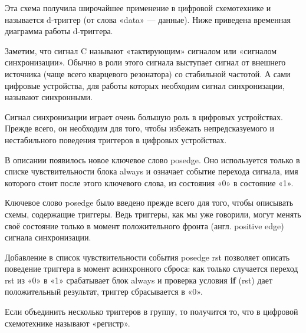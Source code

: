 \documentclass[a5paper, DIV=14, headings=openany, twoside=true,fontsize=10pt, titlepage]{scrreprt}
\newcommand{\quotes}[1]{«#1»}
\newcommand{\eng}[1]{\foreignlanguage{english}{#1}}
\newcommand{\qeng}[1]{\quotes{\eng{#1}}}
\newcommand{\kword}[1]{\eng{\textbf{#1}}}
\begin{document}
\par{Эта схема получила широчайшее применение в цифровой схемотехнике и называется \eng{d}-триггер (от слова \qeng{data} — данные). Ниже приведена временная диаграмма работы \eng{d}-триггера.}
		
\par{Заметим, что сигнал \eng{C} называют \quotes{тактирующим} сигналом или \quotes{сигналом синхронизации}. Обычно в роли этого сигнала выступает сигнал от внешнего источника (чаще всего кварцевого резонатора) со стабильной частотой. А сами цифровые устройства, для работы которых необходим сигнал синхронизации, называют синхронными.}

\par{Сигнал синхронизации играет очень большую роль в цифровых устройствах. Прежде всего, он необходим для того, чтобы избежать непредсказуемого и нестабильного поведения триггеров в цифровых устройствах.}


		
\par{В описании появилось новое ключевое слово \eng{posedge}. Оно используется только в списке чувствительности блока \eng{always} и означает событие перехода сигнала, имя которого стоит после этого ключевого слова, из состояния \quotes{0} в состояние \quotes{1}.}
		
		
\par{Ключевое слово \eng{posedge} было введено прежде всего для того, чтобы описывать схемы, содержащие триггеры. Ведь триггеры, как мы уже говорили, могут менять своё состояние только в момент положительного фронта (англ. \eng{positive edge}) сигнала синхронизации.}
		
		
\par{Добавление в список чувствительности события \eng{posedge rst} позволяет описать поведение триггера в момент асинхронного сброса: как только случается переход \eng{rst} из \quotes{0} в \quotes{1} срабатывает блок \eng{always} и проверка условия \kword{if} (\eng{rst}) дает положительный результат, триггер сбрасывается в \quotes{0}.}

\par{}

\par{Если объединить несколько триггеров в группу, то получится то, что в цифровой схемотехнике называют \quotes{регистр}.}


		
\end{document}
